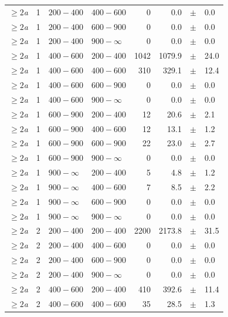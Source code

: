 \begin{table}[!t]
\begin{tabular}{rrllrrcl}
$\geq 2${\it a} & 1 & $ 200- 400$ & $400-600$ &      0 &      0.0 &$\pm$&    0.0 \\
$\geq 2${\it a} & 1 & $ 200- 400$ & $600-900$ &      0 &      0.0 &$\pm$&    0.0 \\
$\geq 2${\it a} & 1 & $ 200- 400$ & $900-\infty$ &      0 &      0.0 &$\pm$&    0.0 \\
$\geq 2${\it a} & 1 & $ 400- 600$ & $200-400$ &   1042 &   1079.9 &$\pm$&   24.0 \\
$\geq 2${\it a} & 1 & $ 400- 600$ & $400-600$ &    310 &    329.1 &$\pm$&   12.4 \\
$\geq 2${\it a} & 1 & $ 400- 600$ & $600-900$ &      0 &      0.0 &$\pm$&    0.0 \\
$\geq 2${\it a} & 1 & $ 400- 600$ & $900-\infty$ &      0 &      0.0 &$\pm$&    0.0 \\
$\geq 2${\it a} & 1 & $ 600- 900$ & $200-400$ &     12 &     20.6 &$\pm$&    2.1 \\
$\geq 2${\it a} & 1 & $ 600- 900$ & $400-600$ &     12 &     13.1 &$\pm$&    1.2 \\
$\geq 2${\it a} & 1 & $ 600- 900$ & $600-900$ &     22 &     23.0 &$\pm$&    2.7 \\
$\geq 2${\it a} & 1 & $ 600- 900$ & $900-\infty$ &      0 &      0.0 &$\pm$&    0.0 \\
$\geq 2${\it a} & 1 & $ 900- \infty$ & $200-400$ &      5 &      4.8 &$\pm$&    1.2 \\
$\geq 2${\it a} & 1 & $ 900- \infty$ & $400-600$ &      7 &      8.5 &$\pm$&    2.2 \\
$\geq 2${\it a} & 1 & $ 900- \infty$ & $600-900$ &      0 &      0.0 &$\pm$&    0.0 \\
$\geq 2${\it a} & 1 & $ 900- \infty$ & $900-\infty$ &      0 &      0.0 &$\pm$&    0.0 \\
$\geq 2${\it a} & 2 & $ 200- 400$ & $200-400$ &   2200 &   2173.8 &$\pm$&   31.5 \\
$\geq 2${\it a} & 2 & $ 200- 400$ & $400-600$ &      0 &      0.0 &$\pm$&    0.0 \\
$\geq 2${\it a} & 2 & $ 200- 400$ & $600-900$ &      0 &      0.0 &$\pm$&    0.0 \\
$\geq 2${\it a} & 2 & $ 200- 400$ & $900-\infty$ &      0 &      0.0 &$\pm$&    0.0 \\
$\geq 2${\it a} & 2 & $ 400- 600$ & $200-400$ &    410 &    392.6 &$\pm$&   11.4 \\
$\geq 2${\it a} & 2 & $ 400- 600$ & $400-600$ &     35 &     28.5 &$\pm$&    1.3 \\

\end{tabular}
\end{table}
